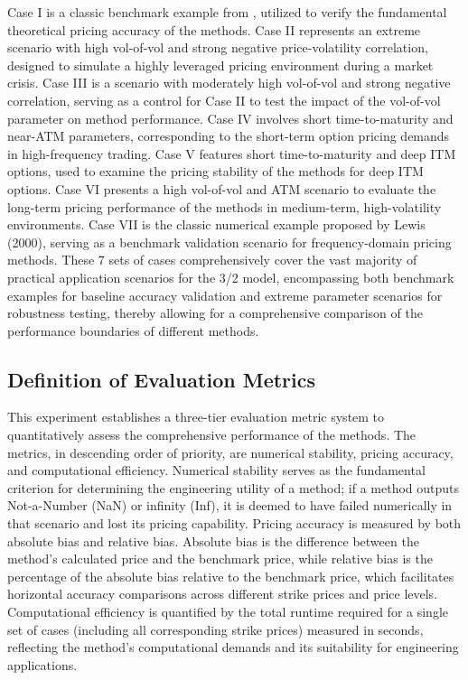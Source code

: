 Case I is a classic benchmark example from \citet{baldeauxEXACTSIMULATION322012}, utilized to verify the fundamental theoretical pricing accuracy of the methods. Case II represents an extreme scenario with high vol-of-vol and strong negative price-volatility correlation, designed to simulate a highly leveraged pricing environment during a market crisis. Case III is a scenario with moderately high vol-of-vol and strong negative correlation, serving as a control for Case II to test the impact of the vol-of-vol parameter on method performance. Case IV involves short time-to-maturity and near-ATM parameters, corresponding to the short-term option pricing demands in high-frequency trading. Case V features short time-to-maturity and deep ITM options, used to examine the pricing stability of the methods for deep ITM options. Case VI presents a high vol-of-vol and ATM scenario to evaluate the long-term pricing performance of the methods in medium-term, high-volatility environments. Case VII is the classic numerical example proposed by Lewis (2000), serving as a benchmark validation scenario for frequency-domain pricing methods. These 7 sets of cases comprehensively cover the vast majority of practical application scenarios for the 3/2 model, encompassing both benchmark examples for baseline accuracy validation and extreme parameter scenarios for robustness testing, thereby allowing for a comprehensive comparison of the performance boundaries of different methods.

\subsection{Definition of Evaluation Metrics}
This experiment establishes a three-tier evaluation metric system to quantitatively assess the comprehensive performance of the methods. The metrics, in descending order of priority, are numerical stability, pricing accuracy, and computational efficiency. Numerical stability serves as the fundamental criterion for determining the engineering utility of a method; if a method outputs Not-a-Number (NaN) or infinity (Inf), it is deemed to have failed numerically in that scenario and lost its pricing capability. Pricing accuracy is measured by both absolute bias and relative bias. Absolute bias is the difference between the method's calculated price and the benchmark price, while relative bias is the percentage of the absolute bias relative to the benchmark price, which facilitates horizontal accuracy comparisons across different strike prices and price levels. Computational efficiency is quantified by the total runtime required for a single set of cases (including all corresponding strike prices) measured in seconds, reflecting the method's computational demands and its suitability for engineering applications.

